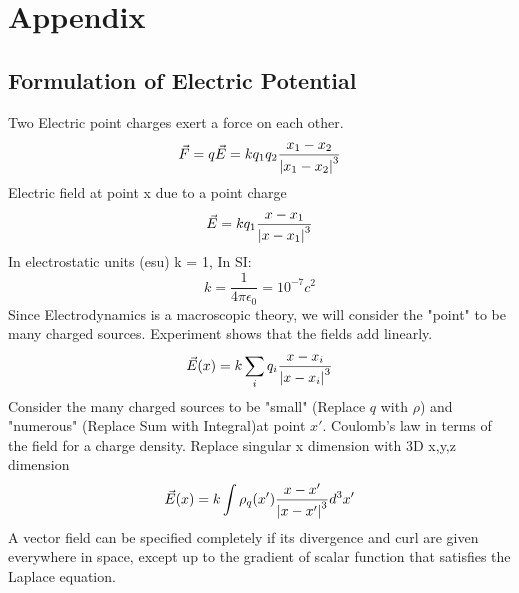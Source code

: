 \documentclass[12pt]{article}
\begin{document}
    
\section{Appendix} 
    \subsection{Formulation of Electric Potential} \label{Appendix1}
        Two Electric point charges exert a force on each other.
        \begin{equation} \label{eq: a1-1}
            \vec{F} = q \vec{E} = k q_1 q_2 \frac{x_1-x_2}{\abs{x_1-x_2}^3}
        \end{equation}
        \newline Electric field at point x due to a point charge
        \begin{equation} \label{eq: a1-2}
            \vec{E} = k q_1 \frac{x-x_1}{\abs{x-x_1}^3}
        \end{equation}
        \newline In electrostatic units (esu) k = 1, In SI:
        \begin{equation} \label{eq: a1-3}
            k = \frac{1}{4 \pi \epsilon_0} = 10^{-7} c^2
        \end{equation}
        \newline Since Electrodynamics is a macroscopic theory, we will consider the "point" to be many charged sources. Experiment shows that the fields add linearly.
        \begin{equation} \label{eq: a1-4}
            \vec{E}(x)= k \sum_i q_i \frac{x-x_i}{\abs{x - x_i}^3}
        \end{equation}
        \newline Consider the many charged sources to be "small" (Replace $q$ with $\rho$) and "numerous" (Replace Sum with Integral)at point $x'$. Coulomb's law in terms of the field for a charge density. Replace singular x dimension with 3D x,y,z dimension 
        \begin{equation} \label{eq: a1-5}
            \vec{E}(x)= k \int \rho_q(x') \frac{x-x'}{\abs{x - x'}^3}d^3x'
        \end{equation}
        A vector field can be specified completely if its divergence and curl are given everywhere in space, except up to the gradient of scalar function that satisfies the Laplace equation. 
\end{document}
